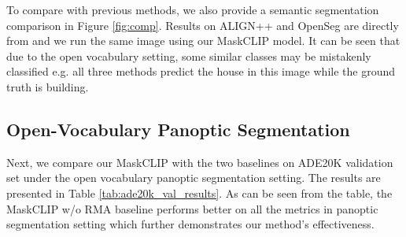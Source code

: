 \documentclass{article}
\theoremstyle{plain}
\theoremstyle{definition}
\theoremstyle{remark}
\begin{document}
To compare with previous methods, we also provide a semantic segmentation comparison in Figure \ref{fig:comp}. Results on ALIGN++ and OpenSeg are directly from  \citep{ghiasi2021open} and we run the same image using our MaskCLIP model. It can be seen that due to the open vocabulary setting, some similar classes may be mistakenly classified e.g. all three methods predict the house in this image while the ground truth is building.


\begin{table*}[!htbp]
\begin{center}
\caption{\small \textbf{Results on open-vocabulary panoptic segmentation using the ADE20k validation dataset.} th and st represent thing and stuff classes respectively. }
\label{tab:ade20k_val_results}
\end{center}
\end{table*}


\subsection{Open-Vocabulary Panoptic Segmentation}

\label{sec:quantitative_panoptic}

Next, we compare our MaskCLIP with the two baselines on ADE20K validation set under the open vocabulary panoptic segmentation setting. The results are presented in Table  \ref{tab:ade20k_val_results}. As can be seen from the table, the MaskCLIP w/o RMA baseline performs better on all the metrics in panoptic segmentation setting which further demonstrates our method's effectiveness.
\end{document}
